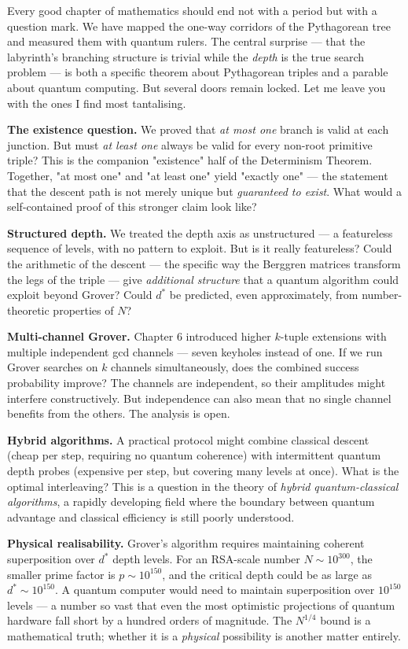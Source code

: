 Every good chapter of mathematics should end not with a period but with a question mark. We have mapped the one-way corridors of the Pythagorean tree and measured them with quantum rulers. The central surprise --- that the labyrinth's branching structure is trivial while the \textit{depth} is the true search problem --- is both a specific theorem about Pythagorean triples and a parable about quantum computing. But several doors remain locked. Let me leave you with the ones I find most tantalising.

\textbf{The existence question.} We proved that \textit{at most one} branch is valid at each junction. But must \textit{at least one} always be valid for every non-root primitive triple? This is the companion "existence" half of the Determinism Theorem. Together, "at most one" and "at least one" yield "exactly one" --- the statement that the descent path is not merely unique but \textit{guaranteed to exist}. What would a self-contained proof of this stronger claim look like?

\textbf{Structured depth.} We treated the depth axis as unstructured --- a featureless sequence of levels, with no pattern to exploit. But is it really featureless? Could the arithmetic of the descent --- the specific way the Berggren matrices transform the legs of the triple --- give \textit{additional structure} that a quantum algorithm could exploit beyond Grover? Could $d^*$ be predicted, even approximately, from number-theoretic properties of $N$?

\textbf{Multi-channel Grover.} Chapter 6 introduced higher $k$-tuple extensions with multiple independent gcd channels --- seven keyholes instead of one. If we run Grover searches on $k$ channels simultaneously, does the combined success probability improve? The channels are independent, so their amplitudes might interfere constructively. But independence can also mean that no single channel benefits from the others. The analysis is open.

\textbf{Hybrid algorithms.} A practical protocol might combine classical descent (cheap per step, requiring no quantum coherence) with intermittent quantum depth probes (expensive per step, but covering many levels at once). What is the optimal interleaving? This is a question in the theory of \textit{hybrid quantum-classical algorithms}, a rapidly developing field where the boundary between quantum advantage and classical efficiency is still poorly understood.

\textbf{Physical realisability.} Grover's algorithm requires maintaining coherent superposition over $d^*$ depth levels. For an RSA-scale number $N \sim 10^{300}$, the smaller prime factor is $p \sim 10^{150}$, and the critical depth could be as large as $d^* \sim 10^{150}$. A quantum computer would need to maintain superposition over $10^{150}$ levels --- a number so vast that even the most optimistic projections of quantum hardware fall short by a hundred orders of magnitude. The $N^{1/4}$ bound is a mathematical truth; whether it is a \textit{physical} possibility is another matter entirely.

